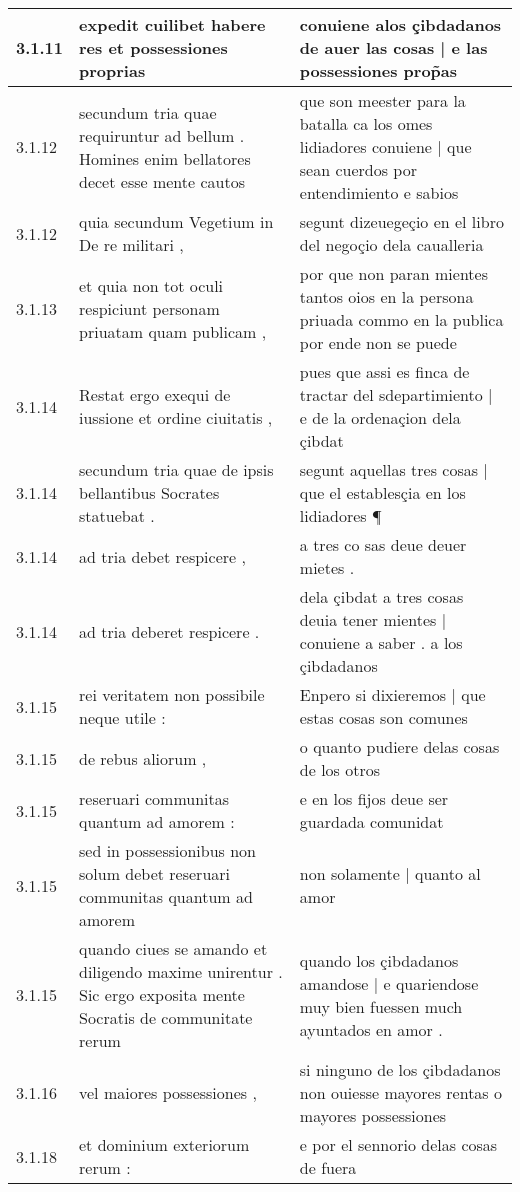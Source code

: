 \begin{tabular}{|p{1cm}|p{6.5cm}|p{6.5cm}|}
3.1.11 & expedit cuilibet habere res et possessiones proprias & conuiene alos çibdadanos de auer las cosas | e las possessiones prop̃as \\\hline
3.1.12 & secundum tria quae requiruntur ad bellum . Homines enim bellatores decet esse mente cautos & que son meester para la batalla ca los omes lidiadores conuiene | que sean cuerdos por entendimiento e sabios \\\hline
3.1.12 & quia secundum Vegetium in De re militari , & segunt dizeuegeçio en el libro del negoçio dela caualleria \\\hline
3.1.13 & et quia non tot oculi respiciunt personam priuatam quam publicam , & por que non paran mientes tantos oios en la persona priuada commo en la publica por ende non se puede \\\hline
3.1.14 & Restat ergo exequi de iussione et ordine ciuitatis , & pues que assi es finca de tractar del sdepartimiento | e de la ordenaçion dela çibdat \\\hline
3.1.14 & secundum tria quae de ipsis bellantibus Socrates statuebat . & segunt aquellas tres cosas | que el establesçia en los lidiadores ¶ \\\hline
3.1.14 & ad tria debet respicere , & a tres co sas deue deuer mietes . \\\hline
3.1.14 & ad tria deberet respicere . & dela çibdat a tres cosas deuia tener mientes | conuiene a saber . a los çibdadanos \\\hline
3.1.15 & rei veritatem non possibile neque utile : & Enpero si dixieremos | que estas cosas son comunes \\\hline
3.1.15 & de rebus aliorum , & o quanto pudiere delas cosas de los otros \\\hline
3.1.15 & reseruari communitas quantum ad amorem : & e en los fijos deue ser guardada comunidat \\\hline
3.1.15 & sed in possessionibus non solum debet reseruari communitas quantum ad amorem & non solamente | quanto al amor \\\hline
3.1.15 & quando ciues se amando et diligendo maxime unirentur . Sic ergo exposita mente Socratis de communitate rerum & quando los çibdadanos amandose | e quariendose muy bien fuessen much ayuntados en amor . \\\hline
3.1.16 & vel maiores possessiones , & si ninguno de los çibdadanos non ouiesse mayores rentas o mayores possessiones \\\hline
3.1.18 & et dominium exteriorum rerum : & e por el sennorio delas cosas de fuera \\\hline

\end{tabular}
